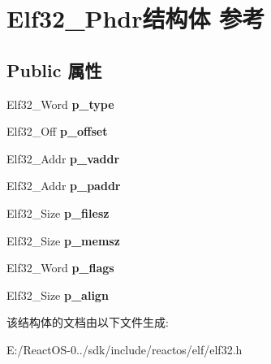 \hypertarget{struct_elf32___phdr}{}\section{Elf32\+\_\+\+Phdr结构体 参考}
\label{struct_elf32___phdr}
\subsection*{Public 属性}
\begin{DoxyCompactItemize}
\item 
\mbox{\label{struct_elf32___phdr_a8b1d2942ddb9abcb85db1429b5116923}} 
Elf32\+\_\+\+Word {\bfseries p\+\_\+type}
\item 
\mbox{\label{struct_elf32___phdr_ac590d4c4b26104216e53058b5b03eef0}} 
Elf32\+\_\+\+Off {\bfseries p\+\_\+offset}
\item 
\mbox{\label{struct_elf32___phdr_a01a298ebc899bcf9c23211a7bf1155a6}} 
Elf32\+\_\+\+Addr {\bfseries p\+\_\+vaddr}
\item 
\mbox{\label{struct_elf32___phdr_af18f0a179a5fca09e3c04bcdce3fac2f}} 
Elf32\+\_\+\+Addr {\bfseries p\+\_\+paddr}
\item 
\mbox{\label{struct_elf32___phdr_ab9a44a4680defa44f985462694f8df1e}} 
Elf32\+\_\+\+Size {\bfseries p\+\_\+filesz}
\item 
\mbox{\label{struct_elf32___phdr_a6f24415b550c2459083d640571d06741}} 
Elf32\+\_\+\+Size {\bfseries p\+\_\+memsz}
\item 
\mbox{\label{struct_elf32___phdr_a35c457e6828894b7b275730593802050}} 
Elf32\+\_\+\+Word {\bfseries p\+\_\+flags}
\item 
\mbox{\label{struct_elf32___phdr_a1ea809b811f480549d0add0db263e8db}} 
Elf32\+\_\+\+Size {\bfseries p\+\_\+align}
\end{DoxyCompactItemize}


该结构体的文档由以下文件生成\+:\begin{DoxyCompactItemize}
\item 
E\+:/\+React\+O\+S-\/0../sdk/include/reactos/elf/elf32.\+h\end{DoxyCompactItemize}
